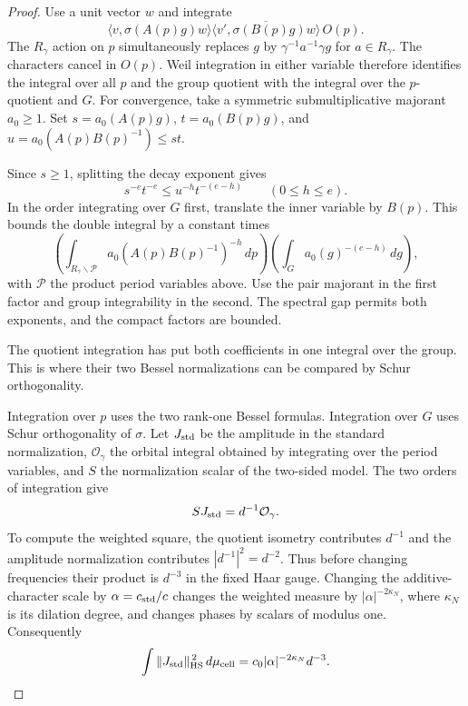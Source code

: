 \begin{proof}

Use a unit vector \(w\) and integrate
\[
 \langle v,\sigma(A(p)g)w\rangle
 \overline{\langle v',\sigma(B(p)g)w\rangle}\,O(p).
\]
The \(R_\gamma\) action on \(p\) simultaneously
replaces \(g\) by \(\gamma^{-1}a^{-1}\gamma g\) for
\(a\in R_\gamma\). The characters cancel in \(O(p)\).
Weil integration in either variable therefore identifies
the integral over all \(p\) and the group quotient with the
integral over the \(p\)-quotient and \(G\). For convergence, take a symmetric submultiplicative
majorant \(a_0\ge1\). Set \(s=a_0(A(p)g)\),
\(t=a_0(B(p)g)\), and \(u=a_0(A(p)B(p)^{-1})\le st\).

Since \(s\ge1\), splitting the decay exponent gives
\[
       s^{-e}t^{-e}\le u^{-h}t^{-(e-h)}
       \qquad(0\le h\le e).
\]
In the order integrating over \(G\) first, translate the
inner variable by \(B(p)\). This bounds the double integral by a
constant times
\[
 \left(\int_{R_\gamma\backslash\mathcal P}
       a_0(A(p)B(p)^{-1})^{-h}\,dp\right)
 \left(\int_G a_0(g)^{-(e-h)}\,dg\right),
\]
with \(\mathcal P\) the product period variables above.
Use the pair majorant in the first factor and group
integrability in the second. The spectral gap permits
both exponents, and the compact factors are bounded.


The quotient integration has put both coefficients in one integral over the group. This is where their two Bessel normalizations can be compared by Schur orthogonality.


Integration over \(p\) uses the two rank-one Bessel formulas.
Integration over \(G\) uses Schur orthogonality of \(\sigma\).
Let \(J_{\rm std}\) be the amplitude in the standard normalization, \(\mathcal O_\gamma\) the orbital integral obtained by integrating over the period variables, and \(S\) the normalization scalar of the two-sided model. The two orders of integration give
\[
 S J_{\rm std}=d^{-1}\mathcal O_\gamma.
\]
To compute the weighted square, the quotient isometry
contributes \(d^{-1}\) and the amplitude normalization
contributes \(|d^{-1}|^2=d^{-2}\). Thus before changing
frequencies their product is \(d^{-3}\) in the fixed Haar
gauge. Changing the additive-character scale by
\(\alpha=c_{\rm std}/c\) changes the weighted measure by
\(|\alpha|^{-2\kappa_N}\), where \(\kappa_N\) is its dilation
degree, and changes phases by scalars of modulus one.
Consequently
\[
 \int \|J_{\rm std}\|_{\rm HS}^{\,2}\,d\mu_{\rm cell}
          = c_0|\alpha|^{-2\kappa_N}d^{-3}.
\]


\end{proof}
